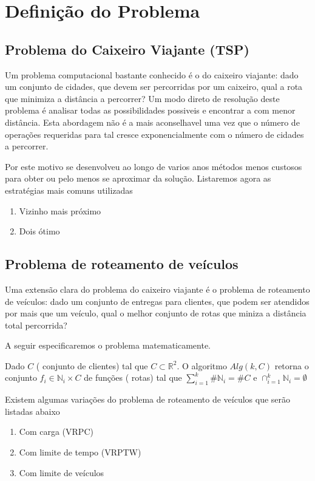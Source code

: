 
\chapter{Definição do Problema}


\section{Problema do Caixeiro Viajante (TSP)}

	Um problema computacional bastante conhecido é o do caixeiro viajante: dado um conjunto de
cidades, que devem ser percorridas por um caixeiro, qual a rota que minimiza a distância a
percorrer?
	Um modo direto de resolução deste problema é analisar todas as possibilidades possiveis e
encontrar a com menor distância. Esta abordagem não é a mais aconselhavel uma vez que o número de
operações requeridas para tal cresce exponencialmente com o número de cidades a percorrer.

	Por este motivo se desenvolveu ao longo de varios anos métodos menos custosos para obter ou pelo
menos se aproximar da solução. Listaremos agora as estratégias mais comuns utilizadas

\begin{enumerate}
\item Vizinho mais próximo
\item Dois ótimo
\end{enumerate}


\section{Problema de roteamento de veículos}

	Uma extensão clara do problema do caixeiro viajante é o problema de roteamento de veículos: dado
um conjunto de entregas para clientes, que podem ser atendidos por mais que um veículo, qual o
melhor conjunto de rotas que miniza a distância total percorrida?

	A seguir especificaremos o problema matematicamente.

	Dado $C$ ( conjunto de clientes) tal que $C \subset \mathbb{R}^2$. O algoritmo $Alg(k,C)$
retorna o conjunto $f_i \in \mathbb{N}_i\times C$ de funções ( rotas) tal que $\sum_{i=1}^k\#
\mathbb{N}_i = \#C$ e $\cap_{i=1}^k \mathbb{N}_i= \emptyset$

	Existem algumas variações do problema de roteamento de veículos que serão listadas abaixo
\begin{enumerate}
\item Com carga (VRPC)
\item Com limite de tempo (VRPTW)
\item Com limite de veículos
\end{enumerate}


